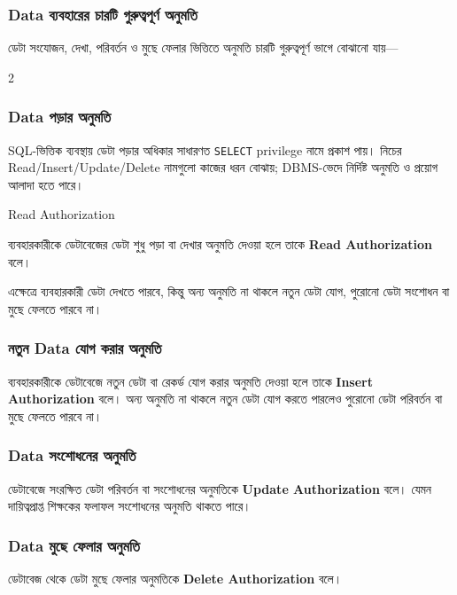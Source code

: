 \subsubsection{Data ব্যবহারের চারটি গুরুত্বপূর্ণ অনুমতি}

ডেটা সংযোজন, দেখা, পরিবর্তন ও মুছে ফেলার ভিত্তিতে অনুমতি
চারটি গুরুত্বপূর্ণ ভাগে বোঝানো যায়---

\begin{multicols}{2}
\subsubsection{Data পড়ার অনুমতি}

SQL-ভিত্তিক ব্যবস্থায় ডেটা পড়ার অধিকার সাধারণত \texttt{SELECT} privilege নামে প্রকাশ পায়। নিচের Read/Insert/Update/Delete নামগুলো কাজের ধরন বোঝায়; DBMS-ভেদে নির্দিষ্ট অনুমতি ও প্রয়োগ আলাদা হতে পারে।

\begin{definitionbox}{Read Authorization}

ব্যবহারকারীকে ডেটাবেজের ডেটা শুধু পড়া বা দেখার অনুমতি দেওয়া হলে
তাকে \textbf{Read Authorization} বলে।

\end{definitionbox}

এক্ষেত্রে ব্যবহারকারী ডেটা দেখতে পারবে, কিন্তু অন্য অনুমতি না থাকলে
নতুন ডেটা যোগ, পুরোনো ডেটা সংশোধন বা মুছে ফেলতে পারবে না।




\subsubsection{নতুন Data যোগ করার অনুমতি}

ব্যবহারকারীকে ডেটাবেজে নতুন ডেটা বা রেকর্ড যোগ করার অনুমতি দেওয়া
হলে তাকে \textbf{Insert Authorization} বলে। অন্য অনুমতি না থাকলে নতুন ডেটা যোগ করতে পারলেও পুরোনো ডেটা
পরিবর্তন বা মুছে ফেলতে পারবে না।


\subsubsection{Data সংশোধনের অনুমতি}

ডেটাবেজে সংরক্ষিত ডেটা পরিবর্তন বা সংশোধনের অনুমতিকে
\textbf{Update Authorization} বলে। যেমন দায়িত্বপ্রাপ্ত শিক্ষকের ফলাফল সংশোধনের অনুমতি
থাকতে পারে।


\subsubsection{Data মুছে ফেলার অনুমতি}

ডেটাবেজ থেকে ডেটা মুছে ফেলার অনুমতিকে
\textbf{Delete Authorization} বলে।




\end{multicols}
